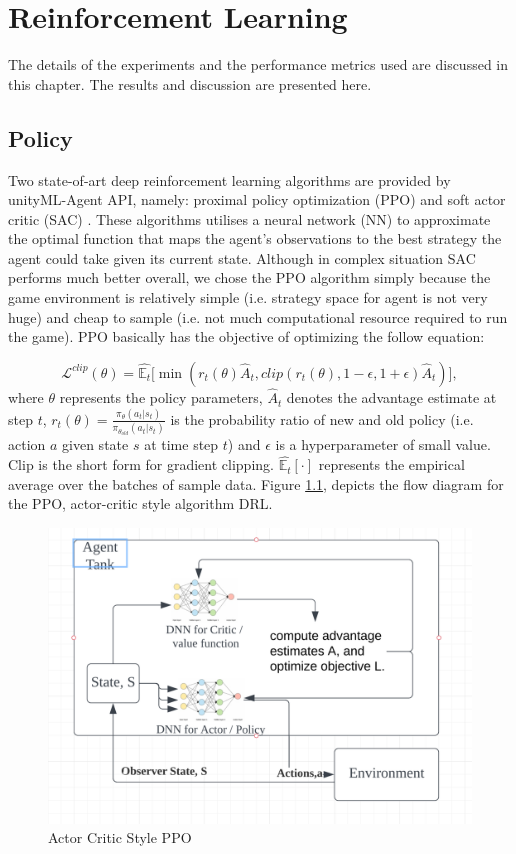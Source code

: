 
\chapter{Reinforcement Learning}

The details of the experiments and the performance metrics used are discussed in this chapter. The results and discussion are presented here.

\section{Policy}

Two state-of-art deep reinforcement learning algorithms are provided by unityML-Agent API, namely: proximal policy optimization (PPO) \cite{schulman2017proximal} and soft actor critic (SAC) \cite{haarnoja2018soft}. These algorithms utilises a neural network (NN) to approximate the optimal function that maps the agent's observations to the best strategy the agent could take given its current state. Although in complex situation SAC performs much better overall, we chose the PPO algorithm simply because the game environment is relatively simple (i.e. strategy space for agent is not very huge) and cheap to sample (i.e. not much computational resource required to run the game). PPO basically has the objective of optimizing the follow equation:

\begin{equation}
    \mathcal{L}^{clip}(\theta) = \hat{\mathbb{E}_t} \biggr[\min(r_t(\theta)\hat{A}_t, clip(r_t(\theta),1-\epsilon,1+\epsilon)\hat{A}_t)    \biggr],
\end{equation}
where $\theta$ represents the policy parameters, $\hat{A}_t$ denotes the advantage estimate at step $t$, $r_t(\theta) = \frac{\pi_\theta (a_t | s_t)}{ \pi_{\theta_{old}} (a_t | s_t) }$ is the probability ratio of new and old policy (i.e. action $a$ given state $s$ at time step $t$) and $\epsilon$ is a hyperparameter of small value. Clip is the short form for gradient clipping. $\hat{\mathbb{E}_t}[\cdot]$ represents the empirical average over the batches of sample data. Figure \ref{fig:PPO}, depicts the flow diagram for the PPO, actor-critic style algorithm DRL.

\begin{figure}
    \centering
    \includegraphics[height=0.6\columnwidth]{Chapter3/PPO.pdf}\par
    \caption{Actor Critic Style PPO}
    \label{fig:PPO}
\end{figure}

